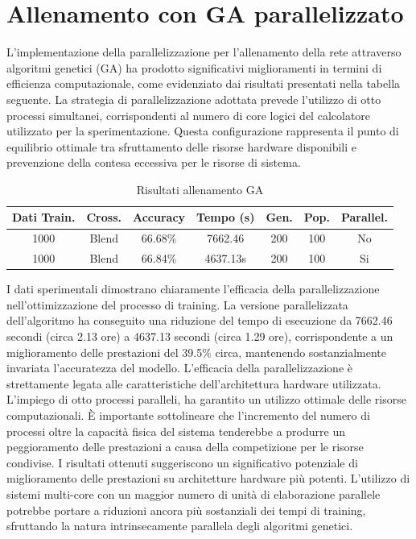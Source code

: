 \section{Allenamento con GA parallelizzato}
    L'implementazione della parallelizzazione per l'allenamento della rete attraverso algoritmi genetici (GA) ha prodotto significativi miglioramenti in termini di efficienza computazionale, come evidenziato dai risultati presentati nella tabella seguente.
    La strategia di parallelizzazione adottata prevede l'utilizzo di otto processi simultanei, corrispondenti al numero di core logici del calcolatore utilizzato per la sperimentazione. Questa configurazione rappresenta il punto di equilibrio ottimale tra sfruttamento delle risorse hardware disponibili e prevenzione della contesa eccessiva per le risorse di sistema.
\begin{table}[htbp]
\centering
\begin{tabular}{|c|c|c|c|c|c|c|}
\hline
\textbf{Dati Train.} & \textbf{Cross.} & \textbf{Accuracy}& \textbf{Tempo (s)} & \textbf{Gen.} & \textbf{Pop.} & \textbf{Parallel.}\\
\hline
1000 & Blend & 66.68\%  & 7662.46 & 200 & 100 & No\\
\hline
1000 & Blend & 66.84\%  & 4637.13s & 200 & 100 & Si\\
\hline
\end{tabular}
\label{tab:GA_results}
\caption{Risultati allenamento GA}
\end{table}

    I dati sperimentali dimostrano chiaramente l'efficacia della parallelizzazione nell'ottimizzazione del processo di training. La versione parallelizzata dell'algoritmo ha conseguito una riduzione del tempo di esecuzione da 7662.46 secondi (circa 2.13 ore) a 4637.13 secondi (circa 1.29 ore), corrispondente a un miglioramento delle prestazioni del 39.5\% circa, mantenendo sostanzialmente invariata l'accuratezza del modello.
    L'efficacia della parallelizzazione è strettamente legata alle caratteristiche dell'architettura hardware utilizzata. L'impiego di otto processi paralleli, ha garantito un utilizzo ottimale delle risorse computazionali. È importante sottolineare che l'incremento del numero di processi oltre la capacità fisica del sistema tenderebbe a produrre un peggioramento delle prestazioni a causa della competizione per le risorse condivise.
    I risultati ottenuti suggeriscono un significativo potenziale di miglioramento delle prestazioni su architetture hardware più potenti. L'utilizzo di sistemi multi-core con un maggior numero di unità di elaborazione parallele potrebbe portare a riduzioni ancora più sostanziali dei tempi di training, sfruttando la natura intrinsecamente parallela degli algoritmi genetici.

